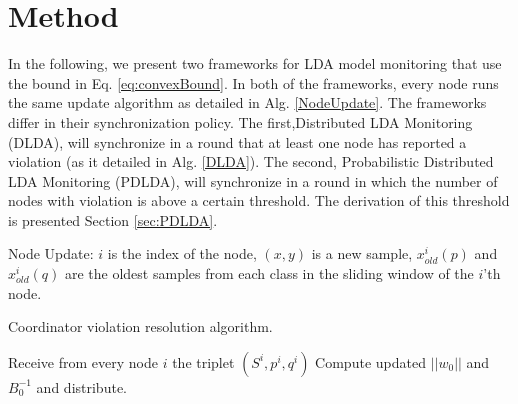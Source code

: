 \documentclass{sig-alternate-05-2015}
\begin{document}
\section{Method}
In the following, we present two frameworks for LDA model monitoring that use
the bound in Eq. \ref{eq:convexBound}. In both of the frameworks, every node runs the same
update algorithm as detailed in Alg. \ref{NodeUpdate}.
The frameworks differ in their synchronization policy. %
The first,Distributed LDA Monitoring (DLDA), will synchronize in a round
that at least one node has reported a violation (as it detailed in Alg.
\ref{DLDA}).
The second, Probabilistic Distributed LDA Monitoring (PDLDA), will synchronize in
a round in which the number of nodes with violation is above a certain threshold.
The derivation of this threshold is presented Section \ref{sec:PDLDA}.


\begin{algorithm}
\caption{Node Update: $i$ is the index of the node, $(x,y)$ is a new sample,
$x_{old}^i(p)$ and $x_{old}^i(q)$ are the oldest samples from each class in the sliding window of the $i$'th node.}
\label{NodeUpdate}
\end{algorithm}

\begin{algorithm}
\caption{Coordinator violation resolution algorithm.}\label{DLDA}
\begin{algorithmic}[1]
\State Receive from every node $i$ the triplet $(S^i,p^i,q^i)$
\State Compute updated $||w_0||$ and $B_0^{-1}$ and distribute.
\EndIf
\EndProcedure
\end{algorithmic}
\end{algorithm}
\end{document}
